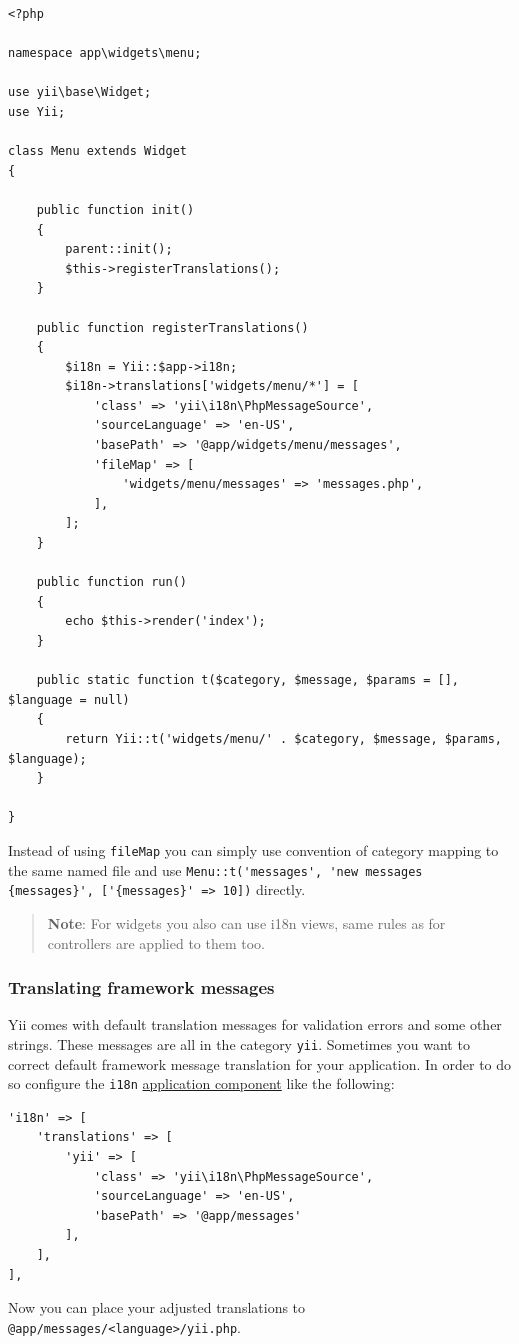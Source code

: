 \lstset{language=php}\begin{lstlisting}
<?php

namespace app\widgets\menu;

use yii\base\Widget;
use Yii;

class Menu extends Widget
{

    public function init()
    {
        parent::init();
        $this->registerTranslations();
    }

    public function registerTranslations()
    {
        $i18n = Yii::$app->i18n;
        $i18n->translations['widgets/menu/*'] = [
            'class' => 'yii\i18n\PhpMessageSource',
            'sourceLanguage' => 'en-US',
            'basePath' => '@app/widgets/menu/messages',
            'fileMap' => [
                'widgets/menu/messages' => 'messages.php',
            ],
        ];
    }

    public function run()
    {
        echo $this->render('index');
    }

    public static function t($category, $message, $params = [], $language = null)
    {
        return Yii::t('widgets/menu/' . $category, $message, $params, $language);
    }

}
\end{lstlisting}
Instead of using \lstinline|fileMap| you can simply use convention of category mapping to the same named file and use \lstinline|Menu::t('messages', 'new messages {messages}', ['{messages}' => 10])| directly.

\begin{quote}\textbf{Note}: For widgets you also can use i18n views, same rules as for controllers are applied to them too.

\end{quote}
\subsubsection{Translating framework messages}
Yii comes with default translation messages for validation errors and some other strings. These messages are all
in the category \lstinline|yii|. Sometimes you want to correct default framework message translation for your application.
In order to do so configure the \lstinline|i18n| \hyperref[structure-application-components.md]{application component} like the following:

\lstset{language=php}\begin{lstlisting}
'i18n' => [
    'translations' => [
        'yii' => [
            'class' => 'yii\i18n\PhpMessageSource',
            'sourceLanguage' => 'en-US',
            'basePath' => '@app/messages'
        ],
    ],
],
\end{lstlisting}
Now you can place your adjusted translations to \lstinline|@app/messages/<language>/yii.php|.

